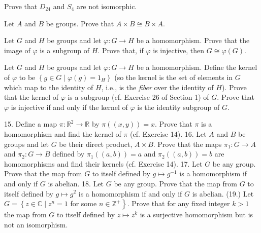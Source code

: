 \begin{questions}
\question
Prove that \(D_{24}\) and \(S_4\) are not isomorphic.



\question
Let \(A\) and \(B\) be groups. Prove that \(A \times B \cong B \times A\).


\question
Let \(G\) and \(H\) be groups and let \(\varphi: G \rightarrow H\) be a homomorphism. 
Prove that the image of \(\varphi\)  is a subgroup of \(H\).
Prove that, if \(\varphi\) is injective, then \(G \cong \varphi(G)\).


\question
Let \(G\) and \(H\) be groups and let \(\varphi: G \rightarrow H\) be a homomorphism. Define the kernel of \(\varphi\) to be \(\left\{g \in G \mid \varphi(g)=1_H\right\}\) (so the kernel is the set of elements in \(G\) which map to the identity of \(H\), i.e., is the \textit{fiber} over the identity of \(H\)). Prove that the kernel of \(\varphi\) is a subgroup (cf. Exercise 26 of Section 1) of \(G\). Prove that \(\varphi\) is injective if and only if the kernel of \(\varphi\) is the identity subgroup of \(G\).

15. Define a map \(\pi: \mathbb{R}^2 \rightarrow \mathbb{R}\) by \(\pi((x, y))=x\). Prove that \(\pi\) is a homomorphism and find the kernel of \(\pi\) (cf. Exercise 14).
16. Let \(A\) and \(B\) be groups and let \(G\) be their direct product, \(A \times B\). Prove that the maps \(\pi_1: G \rightarrow A\) and \(\pi_2: G \rightarrow B\) defined by \(\pi_1((a, b))=a\) and \(\pi_2((a, b))=b\) are homomorphisms and find their kernels (cf. Exercise 14).
17. Let \(G\) be any group. Prove that the map from \(G\) to itself defined by \(g \mapsto g^{-1}\) is a homomorphism if and only if \(G\) is abelian.
18. Let \(G\) be any group. Prove that the map from \(G\) to itself defined by \(g \mapsto g^2\) is a homomorphism if and only if \(G\) is abelian.
(19.) Let \(G=\left\{z \in \mathbb{C} \mid z^n=1\right.\) for some \(\left.n \in \mathbb{Z}^{+}\right\}\). Prove that for any fixed integer \(k>1\) the map from \(G\) to itself defined by \(z \mapsto z^k\) is a surjective homomorphism but is not an isomorphism.










\question










\question











\end{questions}
